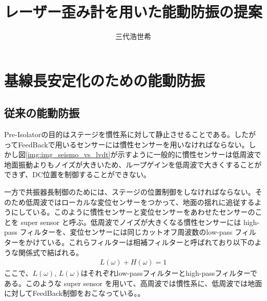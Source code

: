 \documentclass[a4paper,12pt]{jsarticle}
\title{レーザー歪み計を用いた能動防振の提案}
\author{三代浩世希}
\begin{document}
\setcounter{tocdepth}{3}
\maketitle
{}
\tableofcontents

\section{基線長安定化のための能動防振}
\subsection{従来の能動防振}
Pre-Isolatorの目的はステージを慣性系に対して静止させることである。したがってFeedBackで用いるセンサーには慣性センサーを用いなければならない。しかし図\ref{img:img_seismo_vs_lvdt}が示すように一般的に慣性センサーは低周波で地面振動よりもノイズが大きいため、ループゲインを低周波で大きくすることができず、DC位置を制御することができない。

一方で共振器長制御のためには、ステージの位置制御をしなければならない。そのため低周波ではローカルな変位センサーをつかって、地面の揺れに追従するようにしている。このように慣性センサーと変位センサーをあわせたセンサーのことを super sensor と呼ぶ\cite{hua2005low}。低周波でノイズが大きくなる慣性センサーには high-pass フィルターを、変位センサーには同じカットオフ周波数のlow-pass フィルターをかけている。これらフィルターは相補フィルターと呼ばれており以下のような関係式で結ばれる。
\begin{eqnarray}\label{eq:eq01}
  L(\omega) + H(\omega) = 1
\end{eqnarray}  
ここで、$L(\omega),\,L(\omega)$はそれぞれlow-passフィルターとhigh-passフィルターである。このような super sensor を用いて、高周波では慣性系に、低周波では地面に対してFeedBack制御をおこなっている。。
\end{document}
